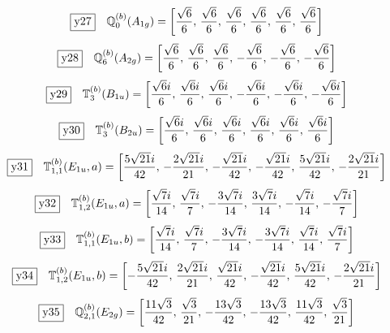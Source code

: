 \documentclass[fleqn,10pt,landscape]{jsarticle}
\begin{document}
\begin{dmath*}
\fbox{y27}\quad \mathbb{Q}_{0}^{(b)}(A_{1g})=\left[ \frac{\sqrt{6}}{6},\, \frac{\sqrt{6}}{6},\, \frac{\sqrt{6}}{6},\, \frac{\sqrt{6}}{6},\, \frac{\sqrt{6}}{6},\, \frac{\sqrt{6}}{6} \right]
\end{dmath*}
\begin{dmath*}
\fbox{y28}\quad \mathbb{Q}_{6}^{(b)}(A_{2g})=\left[ \frac{\sqrt{6}}{6},\, \frac{\sqrt{6}}{6},\, \frac{\sqrt{6}}{6},\, - \frac{\sqrt{6}}{6},\, - \frac{\sqrt{6}}{6},\, - \frac{\sqrt{6}}{6} \right]
\end{dmath*}
\begin{dmath*}
\fbox{y29}\quad \mathbb{T}_{3}^{(b)}(B_{1u})=\left[ \frac{\sqrt{6} i}{6},\, \frac{\sqrt{6} i}{6},\, \frac{\sqrt{6} i}{6},\, - \frac{\sqrt{6} i}{6},\, - \frac{\sqrt{6} i}{6},\, - \frac{\sqrt{6} i}{6} \right]
\end{dmath*}
\begin{dmath*}
\fbox{y30}\quad \mathbb{T}_{3}^{(b)}(B_{2u})=\left[ \frac{\sqrt{6} i}{6},\, \frac{\sqrt{6} i}{6},\, \frac{\sqrt{6} i}{6},\, \frac{\sqrt{6} i}{6},\, \frac{\sqrt{6} i}{6},\, \frac{\sqrt{6} i}{6} \right]
\end{dmath*}
\begin{dmath*}
\fbox{y31}\quad \mathbb{T}_{1,1}^{(b)}(E_{1u},a)=\left[ \frac{5 \sqrt{21} i}{42},\, - \frac{2 \sqrt{21} i}{21},\, - \frac{\sqrt{21} i}{42},\, - \frac{\sqrt{21} i}{42},\, \frac{5 \sqrt{21} i}{42},\, - \frac{2 \sqrt{21} i}{21} \right]
\end{dmath*}
\begin{dmath*}
\fbox{y32}\quad \mathbb{T}_{1,2}^{(b)}(E_{1u},a)=\left[ \frac{\sqrt{7} i}{14},\, \frac{\sqrt{7} i}{7},\, - \frac{3 \sqrt{7} i}{14},\, \frac{3 \sqrt{7} i}{14},\, - \frac{\sqrt{7} i}{14},\, - \frac{\sqrt{7} i}{7} \right]
\end{dmath*}
\begin{dmath*}
\fbox{y33}\quad \mathbb{T}_{1,1}^{(b)}(E_{1u},b)=\left[ \frac{\sqrt{7} i}{14},\, \frac{\sqrt{7} i}{7},\, - \frac{3 \sqrt{7} i}{14},\, - \frac{3 \sqrt{7} i}{14},\, \frac{\sqrt{7} i}{14},\, \frac{\sqrt{7} i}{7} \right]
\end{dmath*}
\begin{dmath*}
\fbox{y34}\quad \mathbb{T}_{1,2}^{(b)}(E_{1u},b)=\left[ - \frac{5 \sqrt{21} i}{42},\, \frac{2 \sqrt{21} i}{21},\, \frac{\sqrt{21} i}{42},\, - \frac{\sqrt{21} i}{42},\, \frac{5 \sqrt{21} i}{42},\, - \frac{2 \sqrt{21} i}{21} \right]
\end{dmath*}
\begin{dmath*}
\fbox{y35}\quad \mathbb{Q}_{2,1}^{(b)}(E_{2g})=\left[ \frac{11 \sqrt{3}}{42},\, \frac{\sqrt{3}}{21},\, - \frac{13 \sqrt{3}}{42},\, - \frac{13 \sqrt{3}}{42},\, \frac{11 \sqrt{3}}{42},\, \frac{\sqrt{3}}{21} \right]
\end{dmath*}
\end{document}
